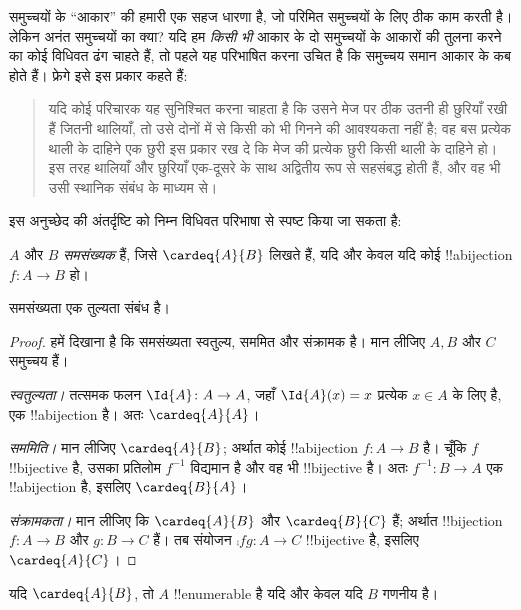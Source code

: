 \documentclass[../../../include/open-logic-section]{subfiles}
\begin{document}


समुच्चयों के ``आकार'' की हमारी एक सहज धारणा है, जो परिमित समुच्चयों के लिए
ठीक काम करती है। लेकिन अनंत समुच्चयों का क्या? यदि हम \emph{किसी भी} आकार
के दो समुच्चयों के आकारों की तुलना करने का कोई विधिवत ढंग चाहते हैं, तो
पहले यह परिभाषित करना उचित है कि समुच्चय समान आकार के कब होते हैं। फ्रेगे
इसे इस प्रकार कहते हैं:
\begin{quote}
  यदि कोई परिचारक यह सुनिश्चित करना चाहता है कि उसने मेज पर ठीक उतनी ही
  छुरियाँ रखी हैं जितनी थालियाँ, तो उसे दोनों में से किसी को भी गिनने की
  आवश्यकता नहीं है; वह बस प्रत्येक थाली के दाहिने एक छुरी इस प्रकार रख दे
  कि मेज की प्रत्येक छुरी किसी थाली के दाहिने हो। इस तरह थालियाँ और छुरियाँ
  एक-दूसरे के साथ अद्वितीय रूप से सहसंबद्ध होती हैं, और वह भी उसी स्थानिक
  संबंध के माध्यम से। \citep[\S70]{Frege1884}
\end{quote}
इस अनुच्छेद की अंतर्दृष्टि को निम्न विधिवत परिभाषा से स्पष्ट किया जा सकता है:

\begin{defn}
  $A$ और $B$ \emph{समसंख्यक} हैं, जिसे $\cardeq{A}{B}$ लिखते हैं, यदि
  और केवल यदि कोई !!a{bijection} $f \colon A \to B$ हो।
\end{defn}

\begin{prop}
समसंख्यता एक तुल्यता संबंध है।
\end{prop}

\begin{proof} 
हमें दिखाना है कि समसंख्यता स्वतुल्य, सममित और संक्रामक है। मान लीजिए
$A, B$ और $C$ समुच्चय हैं।

\emph{स्वतुल्यता।} तत्समक फलन $\Id{A} \colon A \to A$, जहाँ
$\Id{A} (x) = x$ प्रत्येक $x \in A$ के लिए है, एक !!a{bijection} है। अतः
$\cardeq{A}{A}$।

\emph{सममिति।} मान लीजिए $\cardeq{A}{B}$; अर्थात कोई !!a{bijection}
$f\colon A \to B$ है। चूँकि $f$ !!{bijective} है, उसका प्रतिलोम $f^{-1}$
विद्यमान है और वह भी !!{bijective} है। अतः $f^{-1}\colon B \to A$ एक
!!a{bijection} है, इसलिए $\cardeq{B}{A}$।

\emph{संक्रामकता।} मान लीजिए कि $\cardeq{A}{B}$ और $\cardeq{B}{C}$ हैं;
अर्थात !!{bijection} $f\colon A \to B$ और $g\colon B \to
C$ हैं। तब संयोजन $\comp{f}{g}\colon A \to C$ !!{bijective} है, इसलिए
$\cardeq{A}{C}$।
\end{proof}

\begin{prop}
यदि $\cardeq{A}{B}$, तो $A$ !!{enumerable} है यदि
और केवल यदि $B$ गणनीय है।
\end{prop}
\end{document}
